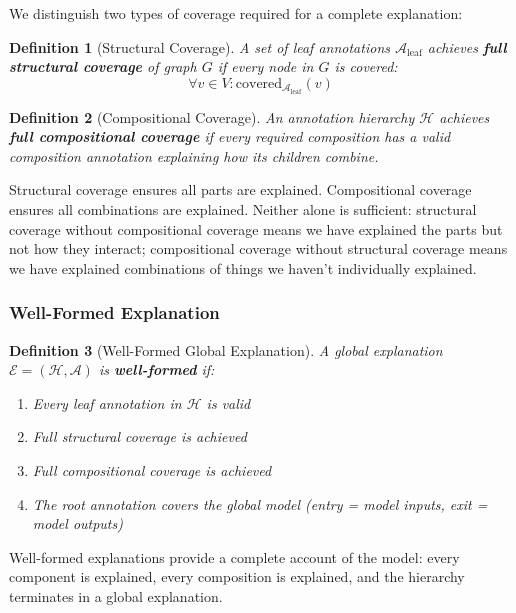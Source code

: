 \documentclass{article}
\newtheorem{definition}{Definition}
\begin{document}
We distinguish two types of coverage required for a complete explanation:

\begin{definition}[Structural Coverage]
A set of leaf annotations $\mathcal{A}_{\text{leaf}}$ achieves \textbf{full structural coverage} of graph $G$ if every node in $G$ is covered:
\[
\forall v \in V: \text{covered}_{\mathcal{A}_{\text{leaf}}}(v)
\]
\end{definition}

\begin{definition}[Compositional Coverage]
An annotation hierarchy $\mathcal{H}$ achieves \textbf{full compositional coverage} if every required composition has a valid composition annotation explaining how its children combine.
\end{definition}

\noindent Structural coverage ensures all parts are explained. Compositional coverage ensures all combinations are explained. Neither alone is sufficient: structural coverage without compositional coverage means we have explained the parts but not how they interact; compositional coverage without structural coverage means we have explained combinations of things we haven't individually explained.

\subsubsection{Well-Formed Explanation}

\begin{definition}[Well-Formed Global Explanation]
\label{def:well-formed-global-explanation}
A global explanation $\mathcal{E} = (\mathcal{H}, \mathcal{A})$ is \textbf{well-formed} if:
\begin{enumerate}
    \item Every leaf annotation in $\mathcal{H}$ is valid
    \item Full structural coverage is achieved
    \item Full compositional coverage is achieved
    \item The root annotation covers the global model (entry = model inputs, exit = model outputs)
\end{enumerate}
\end{definition}

\noindent Well-formed explanations provide a complete account of the model: every component is explained, every composition is explained, and the hierarchy terminates in a global explanation.
\end{document}
